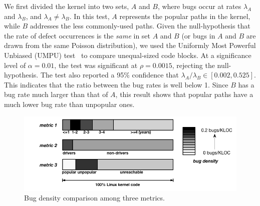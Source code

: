 We first divided the kernel into two sets,
$A$ and $B$, where bugs occur at rates $\lambda_A$ and
$\lambda_B$, and $\lambda_A \neq \lambda_B$. In this test, $A$ represents the popular
paths in the kernel, while $B$
addresses the less commonly-used paths. Given the null-hypothesis
that the rate of defect occurrences is the \textit{same} in set $A$ and $B$
(or bugs in $A$ and $B$ are drawn from the same Poisson distribution),
we used the Uniformly Most Powerful Unbiased (UMPU) test~\cite{shiue1982experiment}
to compare unequal-sized code blocks.
At a significance level of $\alpha=0.01$, the test was significant at
$\rho=0.0015$, rejecting the null-hypothesis.
The test also reported a 95\% confidence that $\lambda_A / \lambda_B
\in [0.002, 0.525]$. This indicates that the ratio between the bug rates is well
below 1. Since $B$ has a bug rate much larger than that of $A$,
%
this result shows that
popular paths have a much lower bug rate than unpopular ones.



\begin{figure}
\centering
\includegraphics[width=1.1\columnwidth]{diagram/bug_density_v2.png}
\caption{\small Bug density comparison among three metrics.}
\label{fig:bug_density}
\end{figure}

